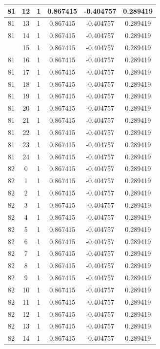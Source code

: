 \documentclass[12pt,a4paper]{article}
\numberwithin{equation}{section}
\numberwithin{figure}{section}
\numberwithin{table}{section}
\begin{document}
\begin{longtable}{|c|c|c|c|c|c|}
81 & 12 & 1 & 0.867415 & -0.404757 & 0.289419 \\ \hline
81 & 13 & 1 & 0.867415 & -0.404757 & 0.289419 \\ \hline
81 & 14 & 1 & 0.867415 & -0.404757 & 0.289419 \\ \hline
\pagebreak
81 & 15 & 1 & 0.867415 & -0.404757 & 0.289419 \\ \hline
81 & 16 & 1 & 0.867415 & -0.404757 & 0.289419 \\ \hline
81 & 17 & 1 & 0.867415 & -0.404757 & 0.289419 \\ \hline
81 & 18 & 1 & 0.867415 & -0.404757 & 0.289419 \\ \hline
81 & 19 & 1 & 0.867415 & -0.404757 & 0.289419 \\ \hline
81 & 20 & 1 & 0.867415 & -0.404757 & 0.289419 \\ \hline
81 & 21 & 1 & 0.867415 & -0.404757 & 0.289419 \\ \hline
81 & 22 & 1 & 0.867415 & -0.404757 & 0.289419 \\ \hline
81 & 23 & 1 & 0.867415 & -0.404757 & 0.289419 \\ \hline
81 & 24 & 1 & 0.867415 & -0.404757 & 0.289419 \\ \hline
82 & 0 & 1 & 0.867415 & -0.404757 & 0.289419 \\ \hline
82 & 1 & 1 & 0.867415 & -0.404757 & 0.289419 \\ \hline
82 & 2 & 1 & 0.867415 & -0.404757 & 0.289419 \\ \hline
82 & 3 & 1 & 0.867415 & -0.404757 & 0.289419 \\ \hline
82 & 4 & 1 & 0.867415 & -0.404757 & 0.289419 \\ \hline
82 & 5 & 1 & 0.867415 & -0.404757 & 0.289419 \\ \hline
82 & 6 & 1 & 0.867415 & -0.404757 & 0.289419 \\ \hline
82 & 7 & 1 & 0.867415 & -0.404757 & 0.289419 \\ \hline
82 & 8 & 1 & 0.867415 & -0.404757 & 0.289419 \\ \hline
82 & 9 & 1 & 0.867415 & -0.404757 & 0.289419 \\ \hline
82 & 10 & 1 & 0.867415 & -0.404757 & 0.289419 \\ \hline
82 & 11 & 1 & 0.867415 & -0.404757 & 0.289419 \\ \hline
82 & 12 & 1 & 0.867415 & -0.404757 & 0.289419 \\ \hline
82 & 13 & 1 & 0.867415 & -0.404757 & 0.289419 \\ \hline
82 & 14 & 1 & 0.867415 & -0.404757 & 0.289419 \\ \hline

\end{longtable}
\end{document}
